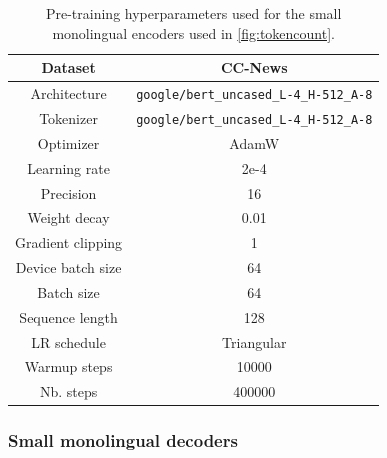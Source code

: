 \begin{table}[H]
\centering
\small
\begin{tabular}{c|c}
\toprule
Dataset & CC-News  \\ \hline
Architecture & \tiny{\texttt{google/bert\_uncased\_L-4\_H-512\_A-8}} \\ \hline
Tokenizer & \tiny{\texttt{google/bert\_uncased\_L-4\_H-512\_A-8}} \\ \hline
Optimizer         & AdamW      \\ \hline
Learning rate     & 2e-4       \\ \hline
Precision  & 16 \\ \hline
Weight decay      & 0.01       \\ \hline
Gradient clipping & 1          \\ \hline
Device batch size        & 64         \\ \hline
Batch size        & 64        \\ \hline
Sequence length   & 128        \\ \hline
LR schedule       & Triangular \\ \hline
Warmup steps      & 10000      \\ \hline
Nb. steps         & 400000        \\ \bottomrule
\end{tabular}
\caption{Pre-training hyperparameters used for the small monolingual encoders used in \autoref{fig:tokencount}.}
\end{table}

\subsubsection{Small monolingual decoders}
\label{app:s_train_mono_dec}


